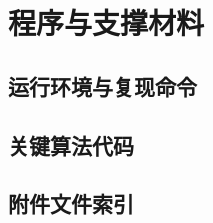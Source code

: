 \clearpage
\appendix
\section{程序与支撑材料}
\subsection{运行环境与复现命令}
\subsection{关键算法代码}
\subsection{附件文件索引}
